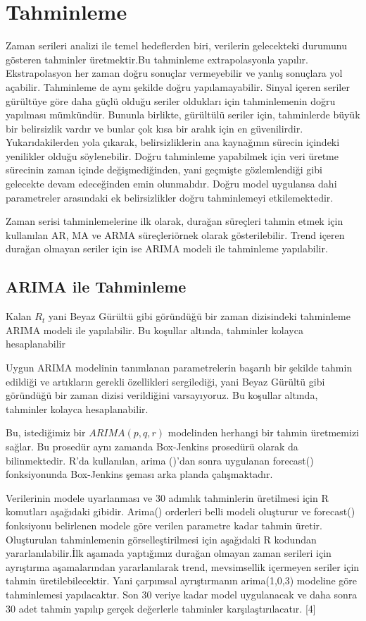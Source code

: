 \documentclass[11pt]{article}
\begin{document}
    \section{Tahminleme}\label{tahminleme}

Zaman serileri analizi ile temel hedeflerden biri, verilerin gelecekteki
durumunu gösteren tahminler üretmektir.Bu tahminleme extrapolasyonla
yapılır. Ekstrapolasyon her zaman doğru sonuçlar vermeyebilir ve yanlış
sonuçlara yol açabilir. Tahminleme de aynı şekilde doğru
yapılamayabilir. Sinyal içeren seriler gürültüye göre daha güçlü olduğu
seriler oldukları için tahminlemenin doğru yapılması mümkündür. Bununla
birlikte, gürültülü seriler için, tahminlerde büyük bir belirsizlik
vardır ve bunlar çok kısa bir aralık için en güvenilirdir.
Yukarıdakilerden yola çıkarak, belirsizliklerin ana kaynağının sürecin
içindeki yenilikler olduğu söylenebilir. Doğru tahminleme yapabilmek
için veri üretme sürecinin zaman içinde değişmediğinden, yani geçmişte
gözlemlendiği gibi gelecekte devam edeceğinden emin olunmalıdır. Doğru
model uygulansa dahi parametreler arasındaki ek belirsizlikler doğru
tahminlemeyi etkilemektedir.

Zaman serisi tahminlemelerine ilk olarak, durağan süreçleri tahmin etmek
için kullanılan AR, MA ve ARMA süreçleriörnek olarak gösterilebilir.
Trend içeren durağan olmayan seriler için ise ARIMA modeli ile
tahminleme yapılabilir.

\subsection{ARIMA ile Tahminleme}\label{arima-ile-tahminleme}

Kalan \(R_t\) yani Beyaz Gürültü gibi göründüğü bir zaman dizisindeki
tahminleme ARIMA modeli ile yapılabilir. Bu koşullar altında, tahminler
kolayca hesaplanabilir

Uygun ARIMA modelinin tanımlanan parametrelerin başarılı bir şekilde
tahmin edildiği ve artıkların gerekli özellikleri sergilediği, yani
Beyaz Gürültü gibi göründüğü bir zaman dizisi verildiğini varsayıyoruz.
Bu koşullar altında, tahminler kolayca hesaplanabilir.

Bu, istediğimiz bir \(ARIMA (p,q,r)\) modelinden herhangi bir tahmin
üretmemizi sağlar. Bu prosedür aynı zamanda Box-Jenkins prosedürü olarak
da bilinmektedir. R'da kullanılan, arima ()'dan sonra uygulanan
forecast() fonksiyonunda Box-Jenkins şeması arka planda çalışmaktadır.

Verilerinin modele uyarlanması ve 30 adımlık tahminlerin üretilmesi için
R komutları aşağıdaki gibidir. Arima() orderleri belli modeli oluşturur
ve forecast() fonksiyonu belirlenen modele göre verilen parametre kadar
tahmin üretir. Oluşturulan tahminlemenin görselleştirilmesi için
aşağıdaki R kodundan yararlanılabilir.İlk aşamada yaptığımız durağan
olmayan zaman serileri için ayrıştırma aşamalarından yararlanılarak
trend, mevsimsellik içermeyen seriler için tahmin üretilebilecektir.
Yani çarpımsal ayrıştırmanın arima(1,0,3) modeline göre tahminlemesi
yapılacaktır. Son 30 veriye kadar model uygulanacak ve daha sonra 30
adet tahmin yapılıp gerçek değerlerle tahminler karşılaştırılacatır.
{[}4{]}
\end{document}
